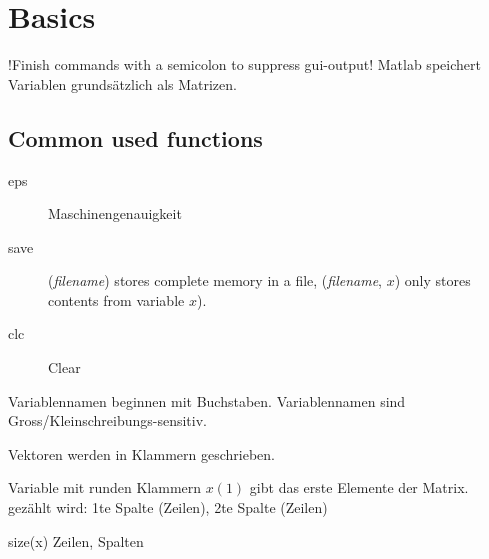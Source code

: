 \section{Basics}
!Finish commands with a semicolon to suppress gui-output! Matlab speichert Variablen grundsätzlich als Matrizen.
\subsection{Common used functions}
\begin{description}
  \item [eps] Maschinengenauigkeit
 \item [save] (\textit{filename}) stores complete memory in a file, (\textit{filename}, $x$) only stores contents from variable $x$).
 \item [clc] Clear
\end{description}
Variablennamen beginnen mit Buchstaben. Variablennamen sind Gross/Kleinschreibungs-sensitiv.

Vektoren werden in Klammern geschrieben.

Variable mit runden Klammern $x(1)$ gibt das erste Elemente der Matrix. gezählt wird: 1te Spalte (Zeilen), 2te Spalte (Zeilen)


size(x) Zeilen, Spalten

